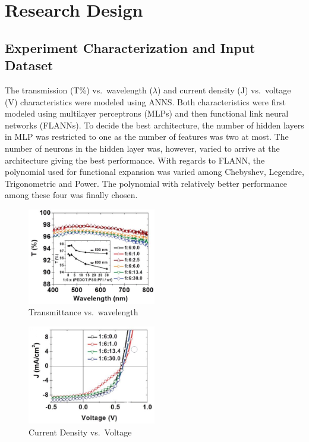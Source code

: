 \documentclass[]{article}
\begin{document}
\hypertarget{research-design}{%
\section{Research Design}\label{research-design}}

\hypertarget{experiment-characterization-and-input-dataset}{%
\subsection{Experiment Characterization and Input Dataset}\label{experiment-characterization-and-input-dataset}}

The transmission (T\%) vs.~wavelength (\(\lambda\)) and current density (J) vs.~voltage (V) characteristics were modeled using ANNS. Both characteristics were first modeled using multilayer perceptrons (MLPs) and then functional link neural networks (FLANNs). To decide the best architecture, the number of hidden layers in MLP was restricted to one as the number of features was two at most. The number of neurons in the hidden layer was, however, varied to arrive at the architecture giving the best performance. With regards to FLANN, the polynomial used for functional expansion was varied among Chebyshev, Legendre, Trigonometric and Power. The polynomial with relatively better performance among these four was finally chosen.

\begin{figure}
\centering
\includegraphics[width=0.5\textwidth,height=\textheight]{images/trans.jpg}
\caption{Transmittance vs.~wavelength \label{fig:transfig}}
\end{figure}

\begin{figure}
\centering
\includegraphics[width=0.5\textwidth,height=\textheight]{images/JV.jpg}
\caption{Current Density vs.~Voltage \label{fig:JVfig}}
\end{figure}
\end{document}
